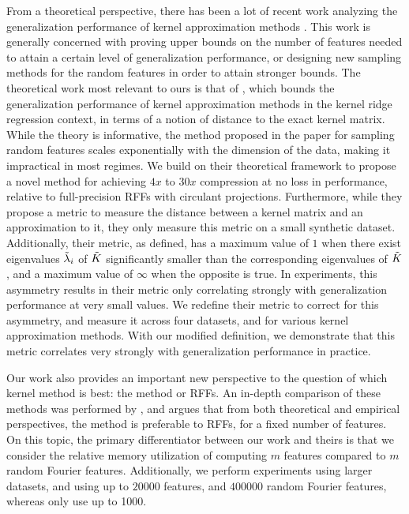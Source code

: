From a theoretical perspective, there has been a lot of recent work analyzing the generalization performance of kernel approximation methods \citep{bach13,alaoui15,rudi15,optrff15,musco17,rudi17,bach17,avron17}. This work is generally concerned with proving upper bounds on the number of features needed to attain a certain level of generalization performance, or designing new sampling methods for the random features in order to attain stronger bounds. The theoretical work most relevant to ours is that of \citet{avron17}, which bounds the generalization performance of kernel approximation methods in the kernel ridge regression context, in terms of a notion of distance to the exact kernel matrix.  While the theory is informative, the method proposed in the paper for sampling random features scales exponentially with the dimension of the data, making it impractical in most regimes. We build on their theoretical framework to propose a novel method for achieving $4x$ to $30x$ compression at no loss in performance, relative to full-precision RFFs with circulant projections. Furthermore, while they propose a metric to measure the distance between a kernel matrix and an approximation to it, they only measure this metric on a small synthetic dataset. Additionally, their metric, as defined, has a maximum value of $1$ when there exist eigenvalues $\tilde{\lambda}_i$ of $\tilde{K}$ significantly smaller than the corresponding eigenvalues of $\tilde{K}$, and a maximum value of $\infty$ when the opposite is true. In experiments, this asymmetry results in their metric only correlating strongly with generalization performance at very small values.  We redefine their metric to correct for this asymmetry, and measure it across four datasets, and for various kernel approximation methods. With our modified definition, we demonstrate that this metric correlates very strongly with generalization performance in practice.

Our work also provides an important new perspective to the question of which kernel method is best: the \Nystrom method or RFFs. An in-depth comparison of these methods was performed by \citet{nysvsrff12}, and argues that from both theoretical and empirical perspectives, the \Nystrom method is preferable to RFFs, for a fixed number of features. On this topic, the primary differentiator between our work and theirs is that we consider the relative memory utilization of computing $m$ \Nystrom features compared to $m$ random Fourier features. Additionally, we perform experiments using larger datasets, and using up to $\num[group-separator={,}]{20000}$ \Nystrom features, and $\num[group-separator={,}]{400000}$ random Fourier features, whereas \citeauthor{nysvsrff12} only use up to 1000.


